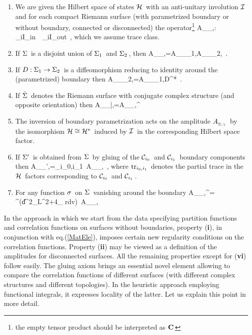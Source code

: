 \renewcommand{\labelenumi}{(\bf\roman{enumi})}
\begin{enumerate}
\item
We are given the Hilbert space of states \s${\cal H}\hspace{0.05cm}$ with
an anti-unitary involution \s${\cal I}\hspace{0.05cm}$ and for each
compact Riemann surface (with parametrized boundary
or without boundary,
connected or disconnected) the operator\footnote{the
empty tensor product should be interpreted
as \s${{\bf C}}\hspace{0.05cm}$}
\qq
A_{_{\Sigma,\ga}}\s:\s\s
\bigotimes\limits_{i\in I_{\rm in}}\CH\ \longrightarrow\
\bigotimes\limits_{i\in I_{\rm out}}\CH\ ,
\label{Ax1}
\qqq
which we assume trace class.
\item
If \s$\Sigma\hspace{0.05cm}$ is a disjoint union of \s$\Sigma_1\hspace{0.05cm}$
and \s$\Sigma_2\hspace{0.05cm}$, then
\qq
A_{_{\Sigma,\ga}}\s=\s A_{_{\Sigma_1,\ga}}\otimes A_{_{\Sigma_2,\ga}}\ .
\non
\qqq
\item
If \s$D:\Sigma_1\rightarrow\Sigma_2\hspace{0.05cm}$ is a diffeomorphism
reducing to identity around the (parametrized) boundary then
\qq
A_{_{\Sigma_2,\ga}}\s=\s A_{_{\Sigma_1,D^*\ga}}\ .
\non
\qqq
\item
If \s$\bar\Sigma\hspace{0.05cm}$ denotes the Riemann surface
with conjugate complex structure (and opposite
orientation) then
\qq
A_{_{\bar\Sigma,\ga}}\s=\s A_{_{\Sigma,\ga}}^{\dagger}
\non
\qqq
\item The inversion of boundary parametrization
acts on the amplitude \s$A_{_{\Sigma,{{\gamma}}}}\hspace{0.05cm}$
by the isomorphism \s${\cal H}\cong{\cal H}^*\hspace{0.05cm}$
induced by \s${\cal I}\hspace{0.05cm}$ in the corresponding Hilbert space
factor.
\item
If \s$\Sigma'\hspace{0.05cm}$ is obtained from
\s$\Sigma\hspace{0.05cm}$ by gluing of the \s${\cal C}_{i_0}\hspace{0.05cm}$ and
\s${\cal C}_{i_1}\hspace{0.05cm}$ boundary components then
\qq
A_{_{\Sigma',\ga}}\s=\s\m \tr_{i_0,i_1}\ A_{_{\Sigma,\ga}}\ ,
\non
\qqq
where \s$\hbox{tr}_{i_0,i_1}\hspace{0.05cm}$ denotes the partial trace
in the \s${\cal H}\hspace{0.05cm}$ factors corresponding
to ${\cal C}_{i_0}\hspace{0.05cm}$ and \s${\cal C}_{i_1}\hspace{0.05cm}$.
\item
For any function \s$\sigma\hspace{0.05cm}$ on \s$\Sigma\hspace{0.05cm}$
vanishing around the boundary
\qq
A_{_{\Sigma,\ee^\sigma \ga}}\s=\s\s
\ee^{\m{}\s(\m\|d\sigma\|^2_{L^2}+4\int_\Sigma
\sigma\m r\s dv\m)}\ A_{_{\Sigma,\gamma}}
\non
\qqq
\end{enumerate}
\vs 0.4cm

In the approach in which we start from the data
specifying partition functions and correlation functions
on surfaces without boundaries, property ({\bf i}),
in conjunction with eq.\s\s(\ref{MatEle}), imposes certain
new regularity conditions on the correlation functions.
Property ({\bf ii}) may be viewed as a definition of
the amplitudes for disconnected surfaces.
All the remaining properties except for ({\bf{vi}}) follow
easily. The gluing axiom brings an essential novel element
allowing to compare the correlation functions of different
surfaces (with different complex structures and different
topologies). In the heuristic
approach employing functional integrals, it expresses locality
of the latter. Let us explain this point in more detail.
\vskip 0.3cm


